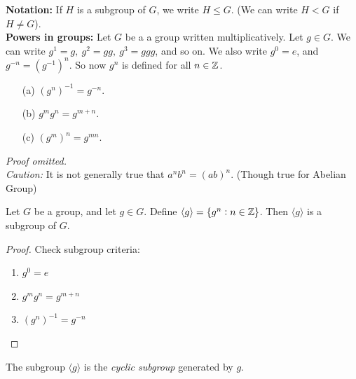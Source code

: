 \documentclass[twoside]{scrartcl}
\begin{document}
\noindent \textbf{Notation:} If $H$ is a subgroup of $G$, we write $H \leq G$. (We can write $H < G$ if $H \neq G$).\\

\noindent \textbf{Powers in groups:} Let $G$ be a a group written multiplicatively. Let $g \in G$. We can write $g^1 = g, ~ g^2 = gg,~ g^3 = ggg$, and so on. We also write $g^{0} = e$, and $g^{-n} = (g^{-1})^n$. So now $g^n$ is defined for all $n \in \mathbb{Z}$.\\

\begin{proposition}\begin{itemize}
 \item[(a)] $(g^n)^{-1} = g^{-n}$.
 \item[(b)] $g^mg^n = g^{m+n}$.
 \item[(c)] $(g^m)^n = g^{mn}$.	
 \end{itemize}
 \end{proposition}
 
 \emph{Proof omitted.}\\
 
 \noindent \textit{Caution:} It is not generally true that $a^nb^n = (ab)^n$. (Though true for Abelian Group)\\
 
\begin{proposition} Let $G$ be a group, and let $g \in G$. Define $\langle g\rangle  = \{g^n : n \in \mathbb{Z}\}$. Then $\langle g\rangle $  is a subgroup of $G$.	
\end{proposition}

 \begin{proof}
 	Check subgroup criteria: \begin{enumerate}
 \item $g^{0} = e$
 \item $g^mg^n = g^{m+n}$
 \item $(g^n)^{-1} = g^{-n}$ \qedhere 
 \end{enumerate}\end{proof}\vspace*{10pt}
 

\begin{definition} The subgroup $\langle g \rangle$ is the \emph{cyclic subgroup} generated by $g$.
	
\end{definition}\vspace*{10pt}
\end{document}
